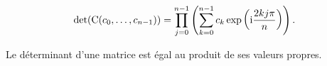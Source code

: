 \begin{corol}
    $$\det(\mathrm{C}(c_0, \dots, c_{n-1})) = \prod_{j=0}^{n-1} \left( \sum_{k=0}^{n-1} c_k \exp \left( \mathrm{i} \frac{2kj \pi}{n} \right) \right).$$
\end{corol}

\begin{preuve}
    Le déterminant d'une matrice est égal au produit de ses valeurs propres.
\end{preuve}

